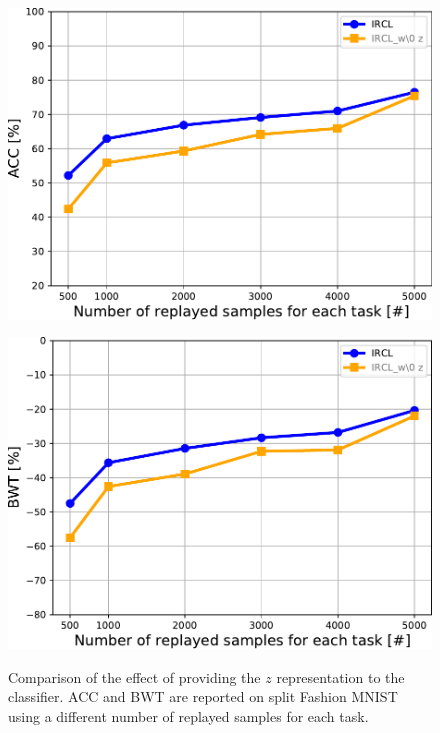 \documentclass[letterpaper]{article} %
\begin{document}
\vspace{-2.74mm}
\vspace{-1.37mm}
\begin{figure}[ht]
\centering
\includegraphics[width=0.7200000000000001\linewidth,height=3.5in ]{pic/w_wo_z_acc_fashion_mnist.pdf}\\
\includegraphics[width=0.8\linewidth]{pic/w_wo_z_bwt_fashion_mnist.pdf}
\caption{Comparison of the effect of providing the $z$ representation to the classifier. ACC and BWT are reported on split Fashion MNIST using a different number of replayed samples for each task.}
\label{z_with_conditioning_fashion}
\end{figure}
\end{document}

